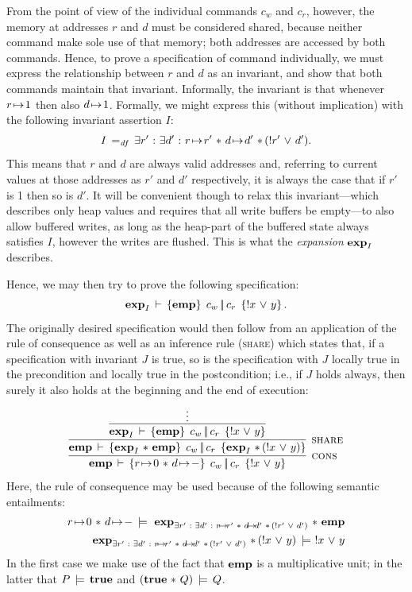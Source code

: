 \documentclass[11pt]{report}
\begin{document}
From the point of view of the individual commands $c_w$ and $c_r$, however, the memory at addresses $r$ and $d$ must be considered shared, because neither command make sole use of that memory; both addresses are accessed by both commands. Hence, to prove a specification of command individually, we must express the relationship between $r$ and $d$ as an invariant, and show that both commands maintain that invariant. Informally, the invariant is that whenever $r \!\mapsto\! 1$ then also $d \!\mapsto\! 1$. Formally, we might express this (without implication) with the following invariant assertion $I$: \[  I \operatorname{\;=_{\mathit{df}}\;} \exists r' \operatorname{\,:\,} \exists d' \operatorname{\,:\,} r \!\mapsto\! r' \operatorname{\,\ast\,} d \!\mapsto\! d' \operatorname{\,\ast\,} (!r' \operatorname{\,\vee\,} d'). \] This means that $r$ and $d$ are always valid addresses and, referring to current values at those addresses as $r'$ and $d'$ respectively, it is always the case that if $r'$ is 1 then so is $d'$. It will be convenient though to relax this invariant---which describes only heap values and requires that all write buffers be empty---to also allow buffered writes, as long as the heap-part of the buffered state always satisfies $I$, however the writes are flushed. This is what the \emph{expansion} $\mathbf{exp}_{I}$ describes. 

Hence, we may then try to prove the following specification: \[ \mathbf{exp}_{I}\,\vdash\,\left\lbrace \mathbf{emp} \right\rbrace\;c_w \operatorname{|\!|} c_r\;\left\lbrace !x \operatorname{\,\vee\,} y \right\rbrace.\] The originally desired specification would then follow from an application of the rule of consequence as well as an inference rule (\textsc{share}) which states that, if a specification with invariant $J$ is true, so is the specification with $J$ locally true in the precondition and locally true in the postcondition; i.e., if $J$ holds always, then surely it also holds at the beginning and the end of execution: \[ \infer[\textsc{cons}]{\spec{\femp}{r \fpointsto 0 \fsep d \fpointsto -}{c_w \oppar c_r}{!x \disj y}}{
  \infer[\textsc{share}]{\spec{\femp}{\fexp{I} \fsep \femp}{c_w \oppar c_r}{\fexp{I} \fsep (!x \disj y)}}{\infer{\spec{\fexp{I}}{\femp}{c_w \oppar c_r}{!x \disj y}}{\vdots}}
}\] Here, the rule of consequence may be used because of the following semantic entailments: \begin{align*}
    r \fpointsto 0 \fsep d \fpointsto - \sentails \, \fexp{\exists r' \st \exists d' \st r \fpointsto r' \fsep d \fpointsto d' \fsep (!r' \disj d')} \fsep \femp \\ 
    \fexp{\exists r' \st \exists d' \st r \fpointsto r' \fsep d \fpointsto d' \fsep (!r' \disj d')} \fsep (!x \disj y)\sentails\, !x \disj y
\end{align*} In the first case we make use of the fact that $\mathbf{emp}$ is a multiplicative unit; in the latter that $P \,\models\, \mathbf{true}$ and $(\mathbf{true} \operatorname{\,\ast\,} Q) \,\models\, Q$.  
\end{document}

